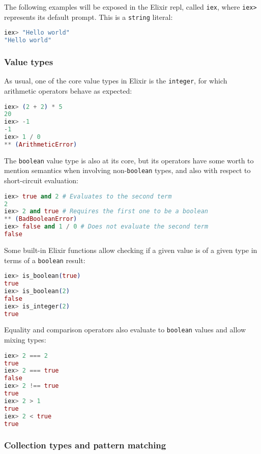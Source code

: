 The following examples will be exposed in the Elixir \gls{repl}, 
called \verb|iex|, where \verb|iex>| represents its default prompt. This is a
\verb|string| literal:

\begin{lstlisting}[language=elixir,numbers=none,frame=none]
iex> "Hello world"
"Hello world"
\end{lstlisting}

\subsubsection{Value types}

As usual, one of the core value types in Elixir is the \verb|integer|, for
which arithmetic operators behave as expected:

\begin{lstlisting}[language=elixir,numbers=none,frame=none]
iex> (2 + 2) * 5
20
iex> -1
-1
iex> 1 / 0
** (ArithmeticError)
\end{lstlisting}

The \verb|boolean| value type is also at its core, but its operators have some
worth to mention semantics when involving non-\verb|boolean| types, and also 
with respect to short-circuit evaluation:

\begin{lstlisting}[language=elixir,numbers=none,frame=none]
iex> true and 2 # Evaluates to the second term
2
iex> 2 and true # Requires the first one to be a boolean
** (BadBooleanError)
iex> false and 1 / 0 # Does not evaluate the second term
false
\end{lstlisting}

Some built-in Elixir functions allow checking if a given value is of a given
type in terms of a \verb|boolean| result:

\begin{lstlisting}[language=elixir,numbers=none,frame=none]
iex> is_boolean(true)
true
iex> is_boolean(2)
false
iex> is_integer(2)
true
\end{lstlisting}

Equality and comparison operators also evaluate to \verb|boolean| values and
allow mixing types:

\begin{lstlisting}[language=elixir,numbers=none,frame=none]
iex> 2 === 2
true
iex> 2 === true
false
iex> 2 !== true
true
iex> 2 > 1
true
iex> 2 < true
true
\end{lstlisting}

\subsubsection{Collection types and pattern matching}

